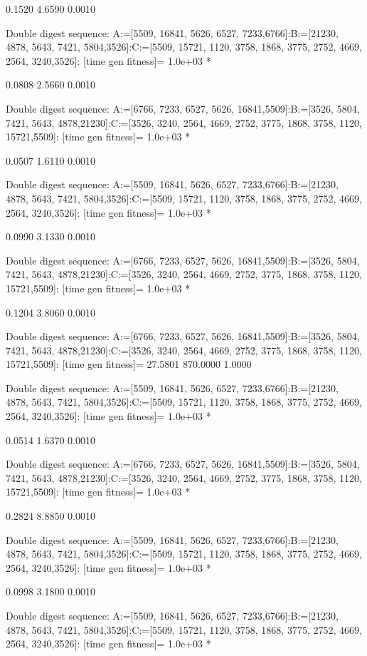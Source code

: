     0.1520    4.6590    0.0010

Double digest sequence:
A:=[5509, 16841, 5626, 6527, 7233,6766]:B:=[21230, 4878, 5643, 7421, 5804,3526]:C:=[5509, 15721, 1120, 3758, 1868, 3775, 2752, 4669, 2564, 3240,3526]:
[time gen fitness]=
   1.0e+03 *

    0.0808    2.5660    0.0010

Double digest sequence:
A:=[6766, 7233, 6527, 5626, 16841,5509]:B:=[3526, 5804, 7421, 5643, 4878,21230]:C:=[3526, 3240, 2564, 4669, 2752, 3775, 1868, 3758, 1120, 15721,5509]:
[time gen fitness]=
   1.0e+03 *

    0.0507    1.6110    0.0010

Double digest sequence:
A:=[5509, 16841, 5626, 6527, 7233,6766]:B:=[21230, 4878, 5643, 7421, 5804,3526]:C:=[5509, 15721, 1120, 3758, 1868, 3775, 2752, 4669, 2564, 3240,3526]:
[time gen fitness]=
   1.0e+03 *

    0.0990    3.1330    0.0010

Double digest sequence:
A:=[6766, 7233, 6527, 5626, 16841,5509]:B:=[3526, 5804, 7421, 5643, 4878,21230]:C:=[3526, 3240, 2564, 4669, 2752, 3775, 1868, 3758, 1120, 15721,5509]:
[time gen fitness]=
   1.0e+03 *

    0.1204    3.8060    0.0010

Double digest sequence:
A:=[6766, 7233, 6527, 5626, 16841,5509]:B:=[3526, 5804, 7421, 5643, 4878,21230]:C:=[3526, 3240, 2564, 4669, 2752, 3775, 1868, 3758, 1120, 15721,5509]:
[time gen fitness]=
   27.5801  870.0000    1.0000

Double digest sequence:
A:=[5509, 16841, 5626, 6527, 7233,6766]:B:=[21230, 4878, 5643, 7421, 5804,3526]:C:=[5509, 15721, 1120, 3758, 1868, 3775, 2752, 4669, 2564, 3240,3526]:
[time gen fitness]=
   1.0e+03 *

    0.0514    1.6370    0.0010

Double digest sequence:
A:=[6766, 7233, 6527, 5626, 16841,5509]:B:=[3526, 5804, 7421, 5643, 4878,21230]:C:=[3526, 3240, 2564, 4669, 2752, 3775, 1868, 3758, 1120, 15721,5509]:
[time gen fitness]=
   1.0e+03 *

    0.2824    8.8850    0.0010

Double digest sequence:
A:=[5509, 16841, 5626, 6527, 7233,6766]:B:=[21230, 4878, 5643, 7421, 5804,3526]:C:=[5509, 15721, 1120, 3758, 1868, 3775, 2752, 4669, 2564, 3240,3526]:
[time gen fitness]=
   1.0e+03 *

    0.0998    3.1800    0.0010

Double digest sequence:
A:=[5509, 16841, 5626, 6527, 7233,6766]:B:=[21230, 4878, 5643, 7421, 5804,3526]:C:=[5509, 15721, 1120, 3758, 1868, 3775, 2752, 4669, 2564, 3240,3526]:
[time gen fitness]=
   1.0e+03 *


